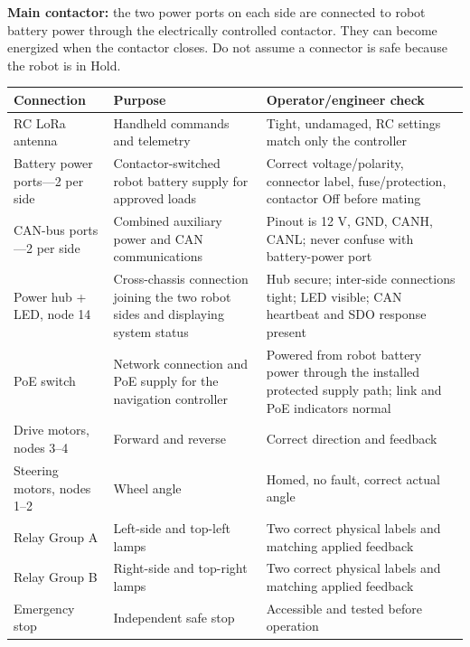 \documentclass[
  10pt,
  letterpaper,
  openany]{report}
\newcounter{none} %
\begin{document}
\begin{manualwarning}

\textbf{Main contactor:} the two power ports on each side are connected
to robot battery power through the electrically controlled contactor.
They can become energized when the contactor closes. Do not assume a
connector is safe because the robot is in Hold.

\end{manualwarning}

{\def\LTcaptype{none} %
\begin{longtable}[]{@{}
  >{\raggedright\arraybackslash}p{}
  >{\raggedright\arraybackslash}p{}
  >{\raggedright\arraybackslash}p{}@{}}
\toprule\noalign{}
\begin{minipage}[b]{\linewidth}\raggedright
Connection
\end{minipage} & \begin{minipage}[b]{\linewidth}\raggedright
Purpose
\end{minipage} & \begin{minipage}[b]{\linewidth}\raggedright
Operator/engineer check
\end{minipage} \\
\midrule\noalign{}
\endhead
\bottomrule\noalign{}
\endlastfoot
RC LoRa antenna & Handheld commands and telemetry & Tight, undamaged, RC
settings match only the controller \\
Battery power ports---2 per side & Contactor-switched robot battery
supply for approved loads & Correct voltage/polarity, connector label,
fuse/protection, contactor Off before mating \\
CAN-bus ports---2 per side & Combined auxiliary power and CAN
communications & Pinout is 12 V, GND, CANH, CANL; never confuse with
battery-power port \\
Power hub + LED, node 14 & Cross-chassis connection joining the two
robot sides and displaying system status & Hub secure; inter-side
connections tight; LED visible; CAN heartbeat and SDO response
present \\
PoE switch & Network connection and PoE supply for the navigation
controller & Powered from robot battery power through the installed
protected supply path; link and PoE indicators normal \\
Drive motors, nodes 3--4 & Forward and reverse & Correct direction and
feedback \\
Steering motors, nodes 1--2 & Wheel angle & Homed, no fault, correct
actual angle \\
Relay Group A & Left-side and top-left lamps & Two correct physical
labels and matching applied feedback \\
Relay Group B & Right-side and top-right lamps & Two correct physical
labels and matching applied feedback \\
Emergency stop & Independent safe stop & Accessible and tested before
operation \\
\end{longtable}
}
\end{document}
